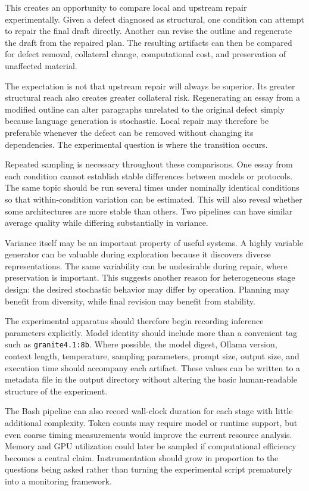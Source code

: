 \documentclass[11pt]{article}
\begin{document}
This creates an opportunity to compare local and upstream repair experimentally. Given a defect diagnosed as structural, one condition can attempt to repair the final draft directly. Another can revise the outline and regenerate the draft from the repaired plan. The resulting artifacts can then be compared for defect removal, collateral change, computational cost, and preservation of unaffected material.

The expectation is not that upstream repair will always be superior. Its greater structural reach also creates greater collateral risk. Regenerating an essay from a modified outline can alter paragraphs unrelated to the original defect simply because language generation is stochastic. Local repair may therefore be preferable whenever the defect can be removed without changing its dependencies. The experimental question is where the transition occurs.

Repeated sampling is necessary throughout these comparisons. One essay from each condition cannot establish stable differences between models or protocols. The same topic should be run several times under nominally identical conditions so that within-condition variation can be estimated. This will also reveal whether some architectures are more stable than others. Two pipelines can have similar average quality while differing substantially in variance.

Variance itself may be an important property of useful systems. A highly variable generator can be valuable during exploration because it discovers diverse representations. The same variability can be undesirable during repair, where preservation is important. This suggests another reason for heterogeneous stage design: the desired stochastic behavior may differ by operation. Planning may benefit from diversity, while final revision may benefit from stability.

The experimental apparatus should therefore begin recording inference parameters explicitly. Model identity should include more than a convenient tag such as \texttt{granite4.1:8b}. Where possible, the model digest, Ollama version, context length, temperature, sampling parameters, prompt size, output size, and execution time should accompany each artifact. These values can be written to a metadata file in the output directory without altering the basic human-readable structure of the experiment.

The Bash pipeline can also record wall-clock duration for each stage with little additional complexity. Token counts may require model or runtime support, but even coarse timing measurements would improve the current resource analysis. Memory and GPU utilization could later be sampled if computational efficiency becomes a central claim. Instrumentation should grow in proportion to the questions being asked rather than turning the experimental script prematurely into a monitoring framework.
\end{document}
